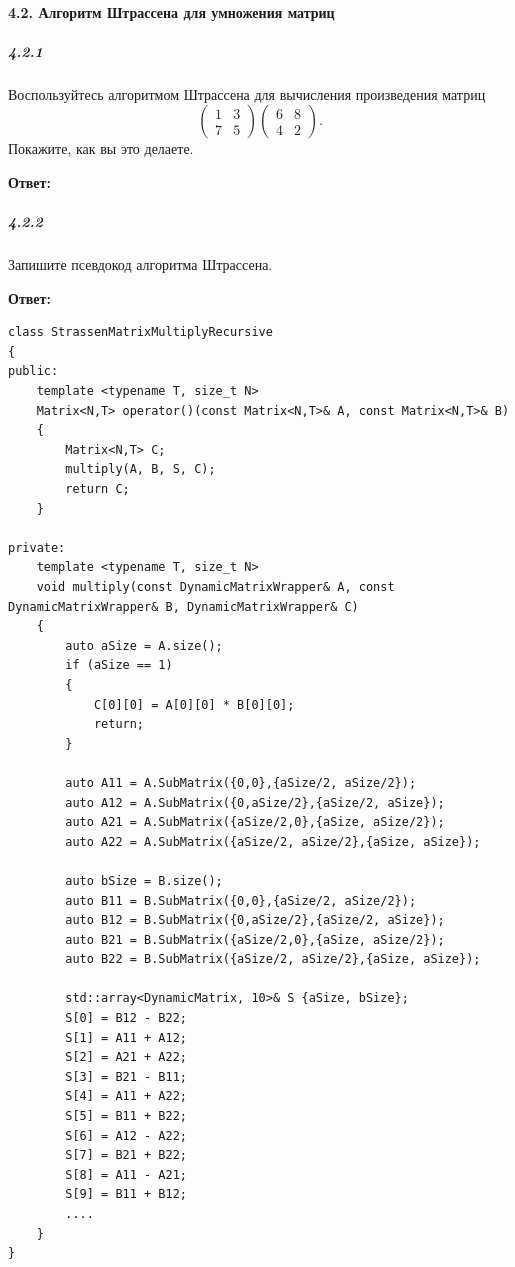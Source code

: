 \paragraph{4.2. Алгоритм Штрассена для умножения матриц}

\subparagraph{4.2.1}
Воспользуйтесь алгоритмом Штрассена для вычисления произведения матриц
\[
\begin{pmatrix}
1 & 3 \\
7 & 5
\end{pmatrix}
\begin{pmatrix}
6 & 8 \\
4 & 2
\end{pmatrix}.
\]
Покажите, как вы это делаете.

\textbf{Ответ:}


\subparagraph{4.2.2}
Запишите псевдокод алгоритма Штрассена.

\textbf{Ответ:}
\begin{lstlisting}
class StrassenMatrixMultiplyRecursive
{
public:
    template <typename T, size_t N>
    Matrix<N,T> operator()(const Matrix<N,T>& A, const Matrix<N,T>& B)
    {
        Matrix<N,T> C;
        multiply(A, B, S, C);
        return C;
    }

private:
    template <typename T, size_t N>
    void multiply(const DynamicMatrixWrapper& A, const DynamicMatrixWrapper& B, DynamicMatrixWrapper& C)
    {
        auto aSize = A.size();
        if (aSize == 1)
        {
            C[0][0] = A[0][0] * B[0][0];
            return;
        }

        auto A11 = A.SubMatrix({0,0},{aSize/2, aSize/2});
        auto A12 = A.SubMatrix({0,aSize/2},{aSize/2, aSize});
        auto A21 = A.SubMatrix({aSize/2,0},{aSize, aSize/2});
        auto A22 = A.SubMatrix({aSize/2, aSize/2},{aSize, aSize});

        auto bSize = B.size();
        auto B11 = B.SubMatrix({0,0},{aSize/2, aSize/2});
        auto B12 = B.SubMatrix({0,aSize/2},{aSize/2, aSize});
        auto B21 = B.SubMatrix({aSize/2,0},{aSize, aSize/2});
        auto B22 = B.SubMatrix({aSize/2, aSize/2},{aSize, aSize});
        
        std::array<DynamicMatrix, 10>& S {aSize, bSize};
        S[0] = B12 - B22;
        S[1] = A11 + A12;
        S[2] = A21 + A22;
        S[3] = B21 - B11;
        S[4] = A11 + A22;
        S[5] = B11 + B22;
        S[6] = A12 - A22;
        S[7] = B21 + B22;
        S[8] = A11 - A21;
        S[9] = B11 + B12; 
        ....
    }
}
\end{lstlisting}

